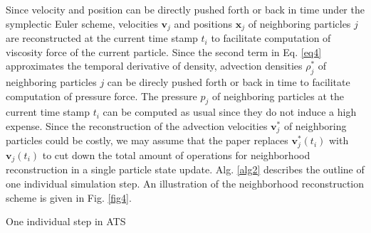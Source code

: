 \documentclass[
	11pt, 
	DIV10,
	ngerman,
	a4paper, 
	oneside, 
	headings=normal, 
	captions=tableheading,
	final, 
	numbers=noenddot
]{scrartcl}
\begin{document}
Since velocity and position can be directly pushed forth or back in time under the symplectic Euler scheme, velocities $ \boldsymbol{v}_{j} $ and positions $ \boldsymbol{x}_{j} $ of neighboring particles $j$ are reconstructed at the current time stamp $ t_{i} $ to facilitate computation of viscosity force of the current particle. Since the second term in Eq. \eqref{eq4} approximates the temporal derivative of density, advection densities $ \rho_{j}^{*} $ of neighboring particles $j$ can be direcly pushed forth or back in time to facilitate computation of pressure force. The pressure $ p_{j} $ of neighboring particles at the current time stamp $ t_{i} $ can be computed as usual since they do not induce a high expense. Since the reconstruction of the advection velocities $ \boldsymbol{v}_{j}^{*} $ of neighboring particles could be costly, we may assume that the paper replaces $ \boldsymbol{v}_{j}^{*}(t_{i}) $ with $ \boldsymbol{v}_{j}(t_{i}) $ to cut down the total amount of operations for neighborhood reconstruction in a single particle state update. Alg. \ref{alg2} describes the outline of one individual simulation step. An illustration of the neighborhood reconstruction scheme is given in Fig. \ref{fig4}.

\large
\begin{algorithm}
	\DontPrintSemicolon
	\SetAlgoLined
	\SetAlCapNameFnt{\large}
	\SetAlCapFnt{\large}
	\caption{\label{alg2} One individual step in ATS \cite{reinhardt2017fully}}
\end{algorithm}
\normalsize
\end{document}
